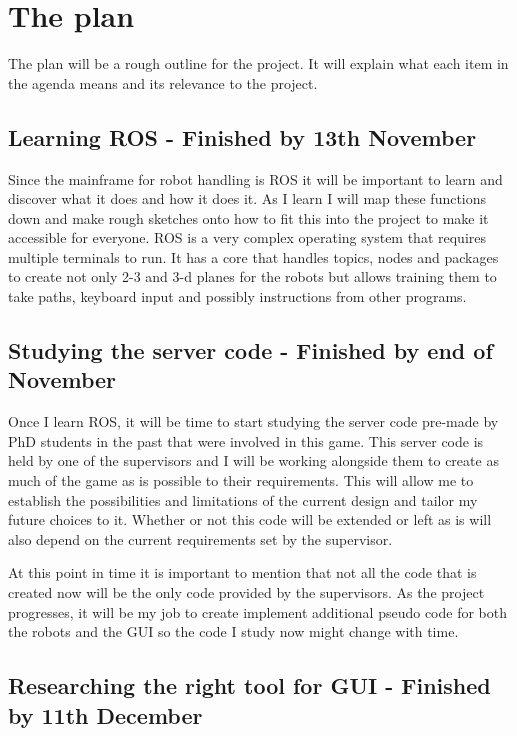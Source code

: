 \documentclass{report}
\begin{document}
  \chapter{The plan}
  
  The plan will be a rough outline for the project. It will explain what each item in the agenda means and its relevance to the project. 

  	\section{Learning ROS - Finished by 13th November}

  	Since the mainframe for robot handling is ROS it will be important to learn and discover what it does and how it does it. As I learn I will map these functions down and make rough sketches onto how to fit this into the project to make it accessible for everyone. ROS is a very complex operating system that requires multiple terminals to run. It has a core that handles topics, nodes and packages to create not only 2-3 and 3-d planes for the robots but allows training them to take paths, keyboard input and possibly instructions from other programs.

  	\section{Studying the server code - Finished by end of November}

  	Once I learn ROS, it will be time to start studying the server code pre-made by PhD students in the past that were involved in this game. This server code is held by one of the supervisors and I will be working alongside them to create as much of the game as is possible to their requirements. This will allow me to establish the possibilities and limitations of the current design and tailor my future choices to it. Whether or not this code will be extended or left as is will also depend on the current requirements set by the supervisor.

  	At this point in time it is important to mention that not all the code that is created now will be the only code provided by the supervisors. As the project progresses, it will be my job to create implement additional pseudo code for both the robots and the GUI so the code I study now might change with time.

  	\section{Researching the right tool for GUI - Finished by 11th December}
\end{document}

